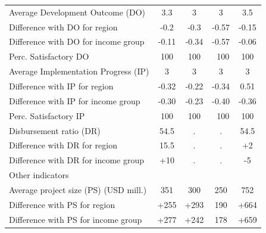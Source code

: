 \documentclass[9.2pt,twocolumn]{article}
\begin{document}
\begin{table}[H]
\begin{tabular}{lcccc}
Average Development Outcome (DO)                  &     \cellcolor{arylideyellow} 3.3               &   \cellcolor{blush} 3                 &     \cellcolor{blush}3     &  \cellcolor{arylideyellow}3.5     \\
Difference with DO for region   &    -0.2     &        -0.3               &      -0.57           &  -0.15 \\
Difference with DO for income group   &      -0.11                &      -0.34               &      -0.57          &   -0.06  \\
Perc. Satisfactory DO                 &     100               &    100                 &     \ 100     &  100     \\
Average Implementation Progress (IP)         &      \cellcolor{blush} 3               &   \cellcolor{blush}    3               &   \cellcolor{blush} 3             & \cellcolor{blush}3  \\
Difference with IP for region   &      -0.32          &       -0.22               &       -0.34          &    0.51 \\
Difference with IP for income group   &      -0.30                &       -0.23               &      -0.40             &   -0.36  \\
Perc. Satisfactory IP                 &      100               &    100                 &     \ 100     &  100     \\
Disbursement ratio (DR) &        \cellcolor{asparagus}54.5              &        .            &  .               & \cellcolor{asparagus}54.5 \\
Difference with DR for region   &    15.5               &     .         &    .           &  +2 \\
Difference with DR for income group   &     +10                &     .              &     .           &   -5  \\\hline
\cellcolor{iceberg}Other indicators      &   \cellcolor{iceberg}      & \cellcolor{iceberg}      & \cellcolor{iceberg} & \cellcolor{iceberg} \\ \hline
Average project size (PS) (USD mill.)                 &    \cellcolor{asparagus}  351                &    \cellcolor{asparagus}  300                 &    \cellcolor{asparagus}  250     &  \cellcolor{asparagus}   752       \\
Difference with PS for region        &     +255               &         +293               &   190                &   +664 \\
Difference with PS for income group   &    +277              &        +242            &  178             & +659 \\

\end{tabular}
\end{table}
\end{document}
